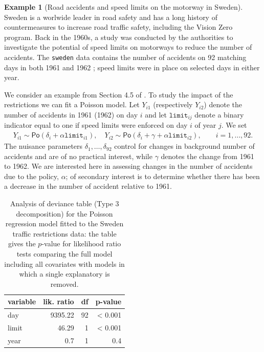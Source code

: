 \documentclass[
  11pt,
  letterpaper,
]{book}
\theoremstyle{definition}
\theoremstyle{definition}
\newtheorem{example}{Example}[chapter]
\theoremstyle{definition}
\theoremstyle{definition}
\theoremstyle{remark}
\begin{document}
\begin{example}[Road accidents and speed limits on the motorway in Sweden]
\protect\hypertarget{exm:roadsweden}{}{\label{exm:roadsweden} {} }Sweden is a worlwide leader in road safety and has a long history of countermeasures to increase road traffic safety, including the Vision Zero program. Back in the 1960s, a study was conducted by the authorities to investigate the potential of speed limits on motorways to reduce the number of accidents. The \texttt{sweden} data contains the number of accidents on 92 matching days in both 1961 and 1962 \citep{Svensson:1981}; speed limits were in place on selected days in either year.
\end{example}

We consider an example from Section 4.5 of \citet{Brazzale/Davison/Reid:2007}.
To study the impact of the restrictions we can fit a Poisson model. Let
\(Y_{i1}\) (respectively \(Y_{i2}\)) denote the number of accidents in 1961
(1962) on day \(i\) and let \(\texttt{limit}_{ij}\) denote a binary
indicator equal to one if speed limits were enforced on day \(i\) of year
\(j\). We set
\begin{align*}
Y_{i1} \sim \mathsf{Po}(\delta_i + \alpha \texttt{limit}_{i1}), \quad Y_{i2} \sim\mathsf{Po}(\delta_i + \gamma +  \alpha \texttt{limit}_{i2}), \qquad i=1, \ldots, 92. 
\end{align*}
The nuisance parameters \(\delta_1, \ldots, \delta_{92}\) control for changes in background number of accidents and are of no practical interest, while \(\gamma\) denotes the change from 1961 to 1962. We are interested here in assessing changes in the number of accidents due to the policy, \(\alpha\); of secondary interest is to determine whether there has been a decrease in the number of accident relative to 1961.

\begin{table}

\caption{\label{tab:swedenglm}Analysis of deviance table (Type 3 decomposition) for the Poisson regression model fitted to the Sweden traffic restrictions data: the table gives the $p$-value for likelihood ratio tests comparing the full model including all covariates with models in which a single explanatory is removed.}
\centering
\begin{tabular}[t]{lrrr}
\toprule
variable & lik. ratio & df & p-value\\
\midrule
day & 9395.22 & 92 & < 0.001\\
limit & 46.29 & 1 & < 0.001\\
year & 0.7 & 1 & 0.4\\
\bottomrule
\end{tabular}
\end{table}
\end{document}
